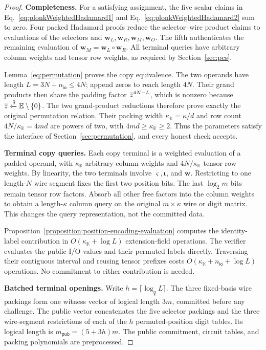 \begin{proof}
\noindent\textbf{Completeness.}
For a satisfying assignment, the five scalar claims in
Eq.~\eqref{eq:plonkWeightedHadamard1} and
Eq.~\eqref{eq:plonkWeightedHadamard2} sum to zero.
Four packed Hadamard proofs reduce the selector--wire product
claims to evaluations of the selectors and
\(\bm w_L,\bm w_R,\bm w_M,\bm w_O\).
The fifth authenticates the remaining evaluation of
\(\bm w_M=\bm w_L\circ\bm w_R\).
All terminal queries have arbitrary column weights and tensor
row weights, as required by Section~\ref{sec:pcs}.

Lemma~\ref{eq:permutation} proves the copy equivalence.
The two operands have length \(L=3N+n_{\mathsf{io}}\leq4N\);
append zeros to reach length \(4N\).
Their grand products then share the padding factor
\(\overline{z}^{4N-L}\), which is nonzero because
\(\overline{z}\mathrel{\xleftarrow{\$}}\mathbb{E}\setminus\{0\}\).
The two grand-product reductions therefore prove exactly the
original permutation relation.
Their packing width \(\kappa_{\mathbb K}=\kappa/d\) and
row count \(4N/\kappa_{\mathbb K}=4md\) are powers of two,
with \(4md\geq\kappa_{\mathbb K}\geq2\).
Thus the parameters satisfy the interface of
Section~\ref{sec:permutation}, and every honest check accepts.

\smallskip\noindent\textbf{Terminal copy queries.}
Each copy terminal is a weighted evaluation of a padded operand,
with \(\kappa_{\mathbb K}\) arbitrary column weights and
\(4N/\kappa_{\mathbb K}\) tensor row weights.
By linearity, the two terminals involve
\(\bm\varsigma,\bm\iota\), and \(\bm w\).
Restricting to one length-\(N\) wire segment fixes the first
two position bits.
The last \(\log_2m\) bits remain tensor row factors.
Absorb all other free factors into the column weights to obtain
a length-\(\kappa\) column query on the original
\(m\times\kappa\) wire or digit matrix.
This changes the query representation, not the committed data.

Proposition~\ref{proposition:position-encoding-evaluation}
computes the identity-label contribution in
\(O(\kappa_{\mathbb K}+\log L)\) extension-field operations.
The verifier evaluates the public-I/O values and their permuted
labels directly. Traversing their contiguous interval and
reusing tensor prefixes costs
\(O(\kappa_{\mathbb K}+n_{\mathsf{io}}+\log L)\) operations.
No commitment to either contribution is needed.

\smallskip\noindent\textbf{Batched terminal openings.}
Write \(h=\lceil\log_{\underline q}L\rceil\).
The three fixed-basis wire packings form one witness vector
of logical length \(3m\), committed before any challenge.
The public vector concatenates the five selector packings
and the three wire-segment restrictions of each of the \(h\)
permuted-position digit tables.
Its logical length is \(m_{\mathsf{pub}}=(5+3h)m\).
The public commitment, circuit tables, and packing polynomials
are preprocessed.


\end{proof}
